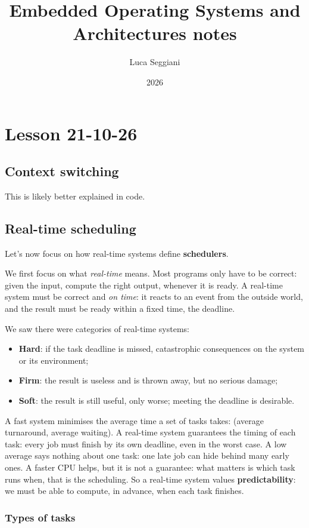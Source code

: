 \documentclass[a4paper,11pt]{article}
\title{Embedded Operating Systems and Architectures notes}
\author{Luca Seggiani}
\date{2026}
\begin{document}
\section{Lesson 21-10-26}

\thispagestyle{empty}
\pagestyle{fancy}

\subsection{Context switching}

This is likely better explained in code.

\subsection{Real-time scheduling}

Let's now focus on how real-time systems define \textbf{schedulers}.

We first focus on what \textit{real-time} means.
Most programs only have to be correct: given the input, compute the right output, whenever it is ready.
A real-time system must be correct and \textit{on time}: it reacts to an event from the outside world, and the result must be ready within a fixed time, the deadline.

We saw there were categories of real-time systems:
\begin{itemize}
	\item \textbf{Hard}: if the task deadline is missed, catastrophic consequences on the system or its environment;
	\item \textbf{Firm}: the result is useless and is thrown away, but no serious damage;
	\item \textbf{Soft}: the result is still useful, only worse; meeting the deadline is desirable.
\end{itemize}

A fast system minimises the average time a set of tasks takes: (average turnaround, average waiting).
A real-time system guarantees the timing of each task: every job must finish by its own deadline, even in the
worst case.
A low average says nothing about one task: one late job can hide behind many early ones.
A faster CPU helps, but it is not a guarantee: what matters is which task runs when, that is the scheduling.
So a real-time system values \textbf{predictability}: we must be able to compute, in advance, when each task finishes.

\subsubsection{Types of tasks}
\end{document}
